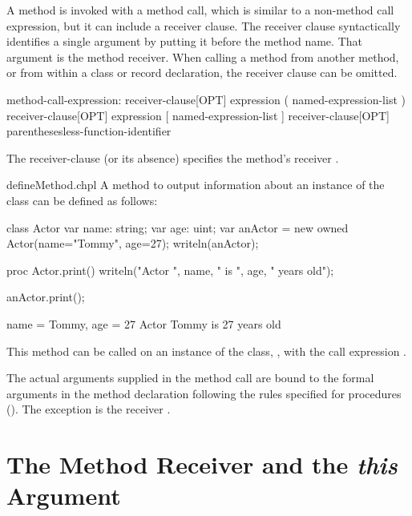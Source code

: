 A method is invoked with a method call, which is similar to a non-method
call expression, but it can include a receiver clause. The receiver
clause syntactically identifies a single argument by
putting it before the method name. That argument is the method receiver.
When calling a method from another method, or from within a class or
record declaration, the receiver clause can be omitted.

\begin{syntax}
method-call-expression:
  receiver-clause[OPT] expression ( named-expression-list )
  receiver-clause[OPT] expression [ named-expression-list ]
  receiver-clause[OPT] parenthesesless-function-identifier
\end{syntax}

The receiver-clause (or its absence) specifies the method's receiver
.

\begin{chapelexample}{defineMethod.chpl}
A method to output information about an instance of the 
class can be defined as follows:
\begin{chapelpre}
class Actor {
  var name: string;
  var age: uint;
}
var anActor = new owned Actor(name="Tommy", age=27);
writeln(anActor);
\end{chapelpre}
\begin{chapel}
proc Actor.print() {
  writeln("Actor ", name, " is ", age, " years old");
}
\end{chapel}
\begin{chapelpost}
anActor.print();
\end{chapelpost}
\begin{chapeloutput}
{name = Tommy, age = 27}
Actor Tommy is 27 years old
\end{chapeloutput}
This method can be called on an instance of the 
class, , with the call expression .
\end{chapelexample}

The actual arguments supplied in the method call are bound to the
formal arguments in the method declaration following the rules specified for
procedures (). The exception is the receiver
.

\section{The Method Receiver and the {\em this} Argument}
\label{Method_receiver_and_this}

